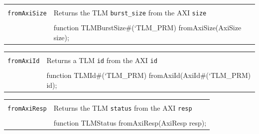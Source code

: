 \documentclass[twoside,letterpaper]{article}
\newcommand{\te}[1]{\texttt{#1}}
\newenvironment{libverbatim}
  {\vspace*{-1.0em}
   \verbatim}
  {\endverbatim
  }
\begin{document}

\begin{center}
\begin{tabular}{|p{1.2 in}|p{5 in}|}
\hline 
&\\
\te{fromAxiSize}&  Returns the TLM \te{burst\_size} from the AXI \te{size} \\
&\\
\cline{2-2}
&\begin{libverbatim}
function TLMBurstSize#(`TLM_PRM) fromAxiSize(AxiSize size);
\end{libverbatim}
\\
\hline
\end{tabular}
\end{center}


\begin{center}
\begin{tabular}{|p{1.2 in}|p{5 in}|}
\hline 
&\\
\te{fromAxiId}&Returns a TLM \te{id} from the AXI \te{id}   \\
&\\
\cline{2-2}
&\begin{libverbatim}
function TLMId#(`TLM_PRM) fromAxiId(AxiId#(`TLM_PRM) id);
\end{libverbatim}
\\
\hline
\end{tabular}
\end{center}


\begin{center}
\begin{tabular}{|p{1.2 in}|p{5 in}|}
\hline 
&\\
\te{fromAxiResp}&Returns the TLM \te{status}  from the AXI \te{resp}   \\
&\\
\cline{2-2}
&\begin{libverbatim}
function TLMStatus fromAxiResp(AxiResp resp);
\end{libverbatim}
\\
\hline
\end{tabular}
\end{center}
\end{document}
